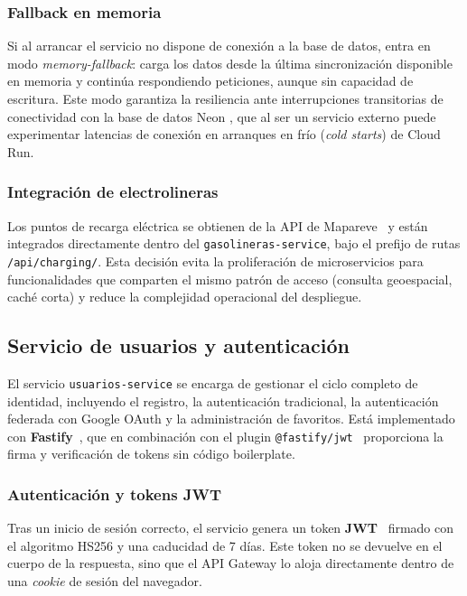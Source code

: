 \subsubsection*{Fallback en memoria}

Si al arrancar el servicio no dispone de conexión a la base de datos, entra en modo
\textit{memory-fallback}: carga los datos desde la última sincronización disponible en
memoria y continúa respondiendo peticiones, aunque sin capacidad de escritura. Este modo
garantiza la resiliencia ante interrupciones transitorias de conectividad con la base de datos Neon \cite{neon_tech2026}, que al
ser un servicio externo puede experimentar latencias de conexión en arranques en frío
(\textit{cold starts}) de Cloud Run.

\subsubsection*{Integración de electrolineras}

Los puntos de recarga eléctrica se obtienen de la API de Mapareve~\cite{reve_mapa}
y están integrados directamente dentro del \texttt{gasolineras-service}, bajo el prefijo
de rutas \texttt{/api/charging/}. Esta decisión evita la proliferación de microservicios
para funcionalidades que comparten el mismo patrón de acceso (consulta geoespacial, caché
corta) y reduce la complejidad operacional del despliegue.

\subsection{Servicio de usuarios y autenticación}
\label{subsec:usuarios_impl}

El servicio \texttt{usuarios-service} se encarga de gestionar el ciclo completo de identidad,
incluyendo el registro, la autenticación tradicional, la autenticación federada con Google OAuth
y la administración de favoritos. Está implementado con \textbf{Fastify}~\cite{fastify}, que en
combinación con el plugin \texttt{@fastify/jwt}~\cite{fastify_jwt} proporciona la firma y
verificación de tokens sin código boilerplate.

\subsubsection*{Autenticación y tokens JWT}

Tras un inicio de sesión correcto, el servicio genera un token \textbf{JWT}~\cite{jwt_rfc7519}
firmado con el algoritmo HS256 y una caducidad de 7 días. Este token no se devuelve en el
cuerpo de la respuesta, sino que el API Gateway lo aloja directamente dentro de una
\textit{cookie} de sesión del navegador.

